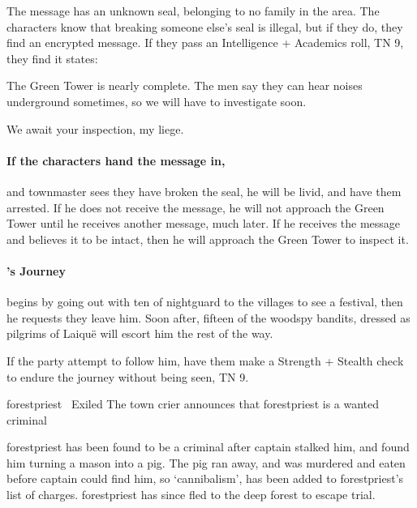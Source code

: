 \begin{multicols}{2}
The message has an unknown seal, belonging to no family in the area.
The characters know that breaking someone else's seal is illegal, but if they do, they find an encrypted message.
If they pass an Intelligence + Academics roll, TN 9, they find it states:

\begin{speechtext}

	The Green Tower is nearly complete.
	The men say they can hear noises underground sometimes, so we will have to investigate soon.

	We await your inspection, my liege.

\end{speechtext}

\paragraph{If the characters hand the message in,}
and \gls{townmaster} sees they have broken the seal, he will be livid, and have them arrested.
If he does not receive the message, he will not approach the Green Tower until he receives another message, much later.
If he receives the message and believes it to be intact, then he will approach the Green Tower to inspect it.

\paragraph{'s Journey}
begins by going out with ten of \gls{nightguard} to the villages to see a festival, then he requests they leave him.
Soon after, fifteen of the woodspy bandits, dressed as pilgrims of Laiqu\"e will escort him the rest of the way.

If the party attempt to follow him, have them make a Strength + Stealth check to endure the journey without being seen, TN 9.



{\Gls{forestpriest}~ Exiled}%
{The town crier announces that \gls{forestpriest} is a wanted criminal}%

\Gls{forestpriest} has been found to be a criminal after \gls{captain} stalked him, and found him turning a mason into a pig.
The pig ran away, and was murdered and eaten before \gls{captain} could find him, so `cannibalism', has been added to \gls{forestpriest}'s list of charges.
\Gls{forestpriest} has since fled to the deep forest to escape trial.


\end{multicols}
